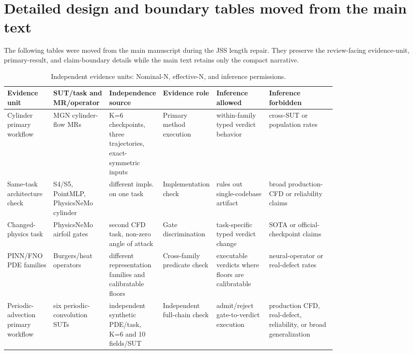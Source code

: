 \documentclass[preprint,12pt]{elsarticle}
\begin{document}
\section{Detailed design and boundary tables moved from the main text}
\label{app:moved-main-tables}

The following tables were moved from the main manuscript during the JSS length repair. They preserve the review-facing evidence-unit, primary-result, and claim-boundary details while the main text retains only the compact narrative.

\begin{table}[!htbp]
\centering
\caption{Independent evidence units: Nominal-N, effective-N, and inference permissions.}
\label{tab:effective-n-supp}
\scriptsize
\renewcommand{\arraystretch}{0.9}
\setlength{\tabcolsep}{1.5pt}
\begin{tabularx}{\linewidth}{@{}>{\raggedright\arraybackslash}p{0.14\linewidth}>{\raggedright\arraybackslash}p{0.17\linewidth}>{\raggedright\arraybackslash}p{0.16\linewidth}>{\raggedright\arraybackslash}p{0.16\linewidth}>{\raggedright\arraybackslash}p{0.16\linewidth}Y@{}}
\toprule
\textbf{Evidence unit} & \textbf{SUT/task and MR/operator} & \textbf{Independence source} & \textbf{Evidence role} & \textbf{Inference allowed} & \textbf{Inference forbidden} \\
\midrule
Cylinder primary workflow & MGN cylinder-flow MRs & K=6 checkpoints, three trajectories, exact-symmetric inputs & Primary method execution & within-family typed verdict behavior & cross-SUT or population rates \\
Same-task architecture check & S4/S5, PointMLP, PhysicsNeMo cylinder & different impls. on one task & Implementation check & rules out single-codebase artifact & broad production-CFD or reliability claims \\
Changed-physics task & PhysicsNeMo airfoil gates & second CFD task, non-zero angle of attack & Gate discrimination & task-specific typed verdict change & SOTA or official-checkpoint claims \\
PINN/FNO PDE families & Burgers/heat operators & different representation families and calibratable floors & Cross-family predicate check & executable verdicts where floors are calibratable & neural-operator or real-defect rates \\
Periodic-advection primary workflow & six periodic-convolution SUTs & independent synthetic PDE/task, K=6 and 10 fields/SUT & Independent full-chain check & admit/reject gate-to-verdict execution & production CFD, real-defect, reliability, or broad generalization \\

\end{tabularx}
\end{table}
\end{document}
